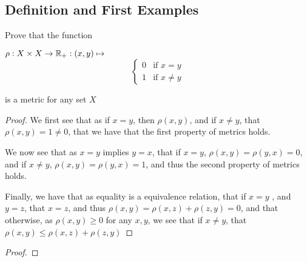 \subsection{Definition and First Examples}

\begin{majorEx}%
  Prove that the function
  \begin{center}
  $\rho : X \times X \rightarrow \mathbb{R}_+ : (x,y) \mapsto $
  \[ \begin{cases} 
    0 & \text{if } x=y \\
    1 & \text{if } x \neq y 
  \end{cases}
  \]
\end{center}
\end{majorEx}
is a metric for any set $X$
\begin{proof}
   We first see that as if $x=y$, then $\rho(x,y)$, and if $x\neq y$, that $\rho(x,y)=1\neq 0$, that we have that the first property of metrics holds.

   We now see that as $x=y$ implies $y=x$, that if $x=y$, 
   $\rho(x,y)=\rho(y,x)=0$, and if $x\neq y$, $\rho(x,y)=\rho(y,x)=1$, and thus the 
   second property of metrics holds.

   Finally, we have that as equality is a equivalence relation, that if $x=y$ , and $y=z$, 
   that $x=z$, and thus $\rho(x,y) = \rho(x,z)+ \rho(z,y)=0$, and that otherwise, as $\rho(x,y)\geq 0$ for any $x,y$, we see that if $x\neq y$, that $\rho(x,y) \leq \rho(x,z)+ \rho(z,y)$   
\end{proof}  
  

\begin{majorEx} %

\end{majorEx}

\begin{proof}

\end{proof}
